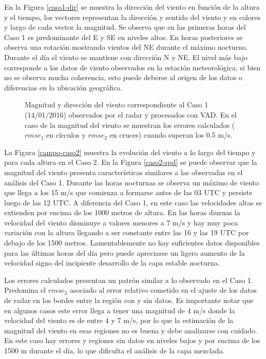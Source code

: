 \documentclass[12pt,spanish,oneside, a4paper]{book}
\begin{document}
En la Figura \ref{caso1-dir} se muestra la dirección del viento en
función de la altura y el tiempo, los vectores representan la dirección
y sentido del viento y en colores y largo de cada vector la magnitud. Se
observa que en las primeras horas del Caso 1 es predominante del E y SE
en niveles altos. En horas posteriores se observa una rotación mostrando
vientos del NE durante el máximo nocturno. Durante el día el viento se
mantiene con dirección N y NE. El nivel más bajo corresponde a los datos
de viento observados en la estación meteorológica, si bien no se observa
mucha coherencia, esto puede deberse al origen de los datos o
diferencias en la ubicación geográfica.

\begin{figure}
\newline{}\caption{Magnitud y dirección del viento  correspondiente al Caso 1 (14/01/2016) observados por el radar y procesados con VAD. En el caso de la magnitud del viento se muestran los errores calculados ($rmse_1$ en círculos y $rmse_2$ en cruces) cuando superan los 0.5 m/s. \label{campo-caso1}}\label{fig:campo-caso1}
\end{figure}

La Figura \ref{campo-caso2} muestra la evolución del viento a lo largo
del tiempo y para cada altura en el Caso 2. En la Figura \ref{caso2-spd}
se puede observar que la magnitud del viento presenta características
similares a las observadas en el análisis del Caso 1. Durante las horas
nocturnas se observa un máximo de viento que llega a los 15 m/s que
comienza a formarse antes de las 03 UTC y persiste luego de las 12 UTC.
A diferencia del Caso 1, en este caso las velocidades altas se extienden
por encima de los 1000 metros de altura. En las horas diurnas la
velocidad del viento disminuye a valores menores a 7 m/s y hay muy poca
variación con la altura llegando a ser constante entre las 16 y las 19
UTC por debajo de los 1500 metros. Lamentablemente no hay suficientes
datos disponibles para las últimas horas del día pero puede apreciarse
un ligero aumento de la velocidad signo del incipiente desarrollo de la
capa estable nocturna.

Los errores calculados presentan un patrón similar a lo observado en el
Caso 1. Predomina el \(rmse_2\) asociado al error relativo cometido en
el ajuste de los datos de radar en los bordes entre la región con y sin
datos. Es importante notar que en algunos casos este error llega a tener
una magnitud de 4 m/s donde la velocidad del viento es de entre 4 y 7
m/s, por lo que la estimación de la magnitud del viento en esas regiones
no es buena y debe analizarse con cuidado. En este caso hay errores y
regiones sin datos en niveles bajos y por encima de los 1500 m durante
el día, lo que dificulta el análisis de la capa mezclada.
\end{document}
